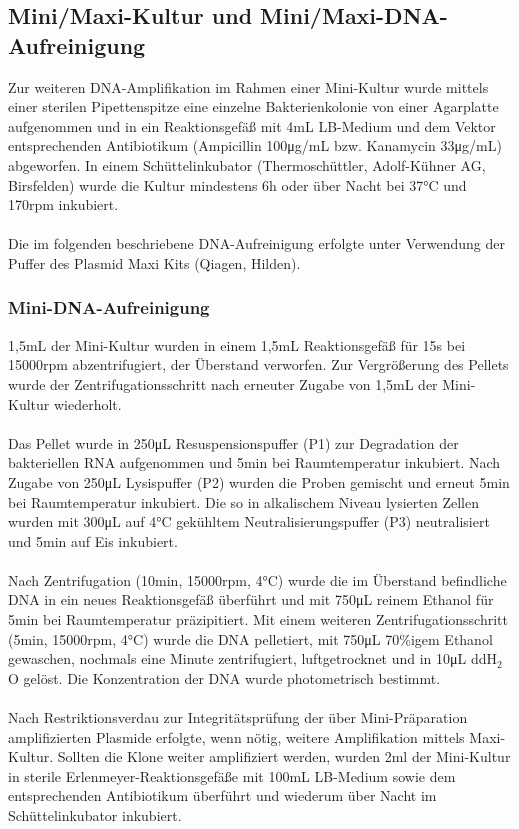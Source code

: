\subsection{Mini/Maxi-Kultur und Mini/Maxi-DNA-Aufreinigung}
Zur weiteren DNA-Amplifikation im Rahmen einer Mini-Kultur wurde mittels einer sterilen Pipettenspitze eine einzelne Bakterienkolonie von einer Agarplatte aufgenommen und in ein Reaktionsgefäß mit 4\si{\milli\liter} LB-Medium und dem Vektor entsprechenden Antibiotikum (Ampicillin 100\si{\micro\gram/\milli\liter} bzw. Kanamycin 33\si{\micro\gram/\milli\liter}) abgeworfen.
In einem Schüttelinkubator (Thermoschüttler, Adolf-Kühner AG, Birsfelden) wurde die Kultur mindestens 6\si{\hour} oder über Nacht bei 37\si{\celsius} und 170\si{rpm} inkubiert.
\\
\\
Die im folgenden beschriebene DNA-Aufreinigung erfolgte unter Verwendung der Puffer des Plasmid Maxi Kits (Qiagen, Hilden).

\subsubsection{Mini-DNA-Aufreinigung}
1,5\si{\milli\liter} der Mini-Kultur wurden in einem 1,5\si{\milli\liter} Reaktionsgefäß für 15\si{\second} bei 15000\si{rpm} abzentrifugiert, der Überstand verworfen. Zur Vergrößerung des Pellets wurde der Zentrifugationsschritt nach erneuter Zugabe von 1,5\si{\milli\liter} der Mini-Kultur wiederholt.
\\ \\
Das Pellet wurde in 250\si{\micro\liter} Resuspensionspuffer (P1) zur Degradation der bakteriellen RNA aufgenommen und 5\si{\minute} bei Raumtemperatur inkubiert. Nach Zugabe von 250\si{\micro\liter} Lysispuffer (P2) wurden die Proben gemischt und erneut 5\si{\minute} bei Raumtemperatur inkubiert. Die so in alkalischem Niveau lysierten Zellen wurden mit 300\si{\micro\liter} auf 4\si{\celsius} gekühltem Neutralisierungspuffer (P3) neutralisiert und 5\si{min} auf Eis inkubiert.
\\ \\
Nach Zentrifugation (10\si{\minute}, 15000\si{rpm}, 4\si{\celsius}) wurde die im Überstand befindliche DNA in ein neues Reaktionsgefäß überführt und mit 750\si{\micro\liter} reinem Ethanol für 5\si{\minute} bei Raumtemperatur präzipitiert. Mit einem weiteren Zentrifugationsschritt (5\si{\minute}, 15000\si{rpm}, 4\si{\celsius}) wurde die DNA pelletiert, mit 750\si{\micro\liter} 70\%igem Ethanol gewaschen, nochmals eine Minute zentrifugiert, luftgetrocknet und in 10\si{\micro\liter} ddH$_2$O gelöst.
Die Konzentration der DNA wurde photometrisch bestimmt.
\\
\\
Nach Restriktionsverdau zur Integritätsprüfung der über Mini-Präparation amplifizierten Plasmide erfolgte, wenn nötig, weitere Amplifikation mittels Maxi-Kultur. Sollten die Klone weiter amplifiziert werden, wurden 2ml der Mini-Kultur in sterile Erlenmeyer-Reaktionsgefäße mit 100\si{\milli\liter} LB-Medium sowie dem entsprechenden Antibiotikum überführt und wiederum über Nacht im Schüttelinkubator inkubiert.

